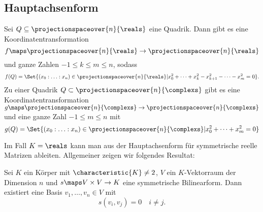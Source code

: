 \subsection*{Hauptachsenform}
\begin{satz}\label{projektive_quadriken_hauptachsenform}
  Sei \( Q\subseteq \projectionspaceover{n}{\reals} \) eine Quadrik. Dann gibt es eine Koordinatentransformation
  \begin{equation*}
    f\maps \projectionspaceover{n}{\reals}\to\projectionspaceover{n}{\reals}
  \end{equation*}
  und ganze Zahlen \( -1\leq k\leq m\leq n \), sodass
  \begin{equation*}
    f(Q)=\Set{(x_0:\dotsc:x_n)\in \projectionspaceover{n}{\reals}|x_0^2+\dotsb+x_k^2-x_{k+1}^2-\dotsb-x_m^2=0}.
  \end{equation*}
  Zu einer Quadrik \( Q\subset \projectionspaceover{n}{\complexs} \) gibt es eine Koordinatentransformation \( g\maps \projectionspaceover{n}{\complexs}\to \projectionspaceover{n}{\complexs} \) und eine ganze Zahl \( -1\leq m\leq n \) mit
  \begin{equation*}
    g(Q)=\Set{(x_0:\dotsc:x_n)\in \projectionspaceover{n}{\complexs}|x_0^2+\dotsb+x_m^2=0}
  \end{equation*}
  
\end{satz}
\begin{bemerkung*}
  Im Fall \( K=\reals \) kann man  aus der Hauptachsenform für symmetrische reelle Matrizen ableiten. Allgemeiner zeigen wir folgendes Resultat:
\end{bemerkung*}
\begin{lemma}\label{symmetrische_bilinearform_diagonalisierung}
  Sei \( K \) ein Körper mit \( \characteristic{K}\neq 2 \), \( V \) ein \( K \)-Vektorraum der Dimension \( n \) und \( s\maps V\times V\to K \) eine symmetrische Bilinearform. Dann existiert eine Basis \( v_1,\dotsc,v_n\in V \) mit 
  \begin{equation*}
    s(v_i,v_j)=0\quad i\neq j.
  \end{equation*}
\end{lemma}
